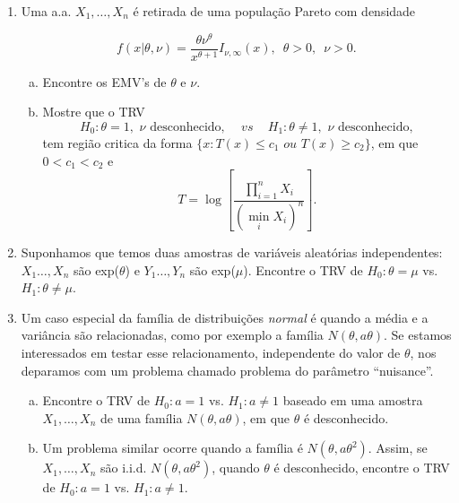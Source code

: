 \documentclass[10pt,brazil,addpoints]{exam}
\begin{document}
\begin{enumerate}[1.]
\medskip
\item %
 Uma a.a. $X_1,\ldots,X_n$ é retirada de uma população Pareto com densidade

$$f(x|\theta,\nu)=\frac{\theta\nu^\theta}{x^{\theta+1}}I_{\nu,\infty}(x),\,\,\,\theta>0,\,\,\,\nu>0.$$

\begin{enumerate}[a)]
\item Encontre os EMV's de $\theta$ e $\nu$.

\item Mostre que o TRV
$$H_0: \theta=1,\,\,\nu\,\,\mbox{desconhecido},\,\,\,\,\,\,\,vs\,\,\,\,\,\,\, H_1: \theta\neq 1,\,\,\nu\,\,\mbox{desconhecido},$$
tem região critica da forma $\{x:T(x)\leq c_1\,\,ou\,\,T(x)\geq c_2\}$, em que $0<c_1<c_2$ e $$T=\log \left[ \frac{\prod_{i=1}^{n}X_i}{(\min_i X_i)^n}\right].$$
\end{enumerate}





\medskip
\item %
Suponhamos que temos duas amostras de variáveis aleatórias independentes: $X_1\ldots,X_n$ são exp($\theta$) e $Y_1\ldots,Y_n$ são exp($\mu$). Encontre o TRV de $H_0:\theta=\mu$ vs. $H_1:\theta\neq \mu$.

%









\medskip
\item %
Um caso especial da família de distribuições \emph{normal} é quando a média e a variância são relacionadas, como por exemplo a família $N(\theta,a\theta)$. Se estamos interessados em testar esse relacionamento, independente do valor de $\theta$, nos deparamos com um problema chamado problema do parâmetro ``nuisance''.

\begin{enumerate}[a)]
\item Encontre o TRV de $H_0:a=1$ vs. $H_1:a\neq 1$ baseado em uma amostra $X_1,\ldots,X_n$ de uma família $N(\theta,a\theta)$, em que $\theta$ é desconhecido.

\item  Um problema similar ocorre quando a família é $N(\theta,a\theta^2)$. Assim, se  $X_1,\ldots,X_n$ são i.i.d. $N(\theta,a\theta^2)$, quando $\theta$ é desconhecido, encontre o TRV de $H_0:a=1$ vs. $H_1:a\neq 1$.
\end{enumerate}






\end{enumerate}
\end{document}

